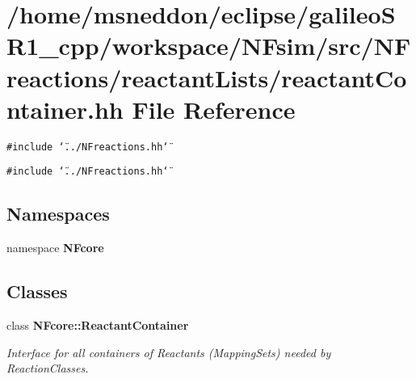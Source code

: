 \section{/home/msneddon/eclipse/galileoSR1\_\-cpp/workspace/NFsim/src/NFreactions/reactantLists/reactantContainer.hh File Reference}
\label{reactantContainer_8hh}


{\tt \#include \char`\"{}../NFreactions.hh\char`\"{}}\par
{\tt \#include \char`\"{}../NFreactions.hh\char`\"{}}\par
\subsection*{Namespaces}
\begin{CompactItemize}
\item 
namespace {\bf NFcore}
\end{CompactItemize}
\subsection*{Classes}
\begin{CompactItemize}
\item 
class {\bf NFcore::ReactantContainer}
\begin{CompactList}\small\item\em Interface for all containers of Reactants (MappingSets) needed by ReactionClasses. \item\end{CompactList}\end{CompactItemize}
